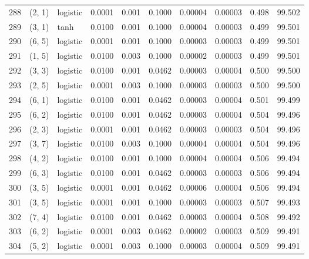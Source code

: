 \begin{tabular}{lllrrrrrrr}
288 &      (2, 1) &  logistic &  0.0001 &  0.001 &  0.1000 &          0.00004 &    0.00003 &       0.498 &    99.502 \\
289 &      (3, 1) &      tanh &  0.0100 &  0.001 &  0.1000 &          0.00004 &    0.00003 &       0.499 &    99.501 \\
290 &      (6, 5) &  logistic &  0.0001 &  0.001 &  0.1000 &          0.00003 &    0.00003 &       0.499 &    99.501 \\
291 &      (1, 5) &  logistic &  0.0100 &  0.003 &  0.1000 &          0.00002 &    0.00003 &       0.499 &    99.501 \\
292 &      (3, 3) &  logistic &  0.0100 &  0.001 &  0.0462 &          0.00003 &    0.00004 &       0.500 &    99.500 \\
293 &      (2, 5) &  logistic &  0.0001 &  0.003 &  0.1000 &          0.00003 &    0.00003 &       0.500 &    99.500 \\
294 &      (6, 1) &  logistic &  0.0100 &  0.001 &  0.0462 &          0.00003 &    0.00004 &       0.501 &    99.499 \\
295 &      (6, 2) &  logistic &  0.0100 &  0.001 &  0.0462 &          0.00003 &    0.00004 &       0.504 &    99.496 \\
296 &      (2, 3) &  logistic &  0.0001 &  0.001 &  0.0462 &          0.00003 &    0.00003 &       0.504 &    99.496 \\
297 &      (3, 7) &  logistic &  0.0100 &  0.003 &  0.1000 &          0.00004 &    0.00004 &       0.504 &    99.496 \\
298 &      (4, 2) &  logistic &  0.0100 &  0.001 &  0.1000 &          0.00004 &    0.00004 &       0.506 &    99.494 \\
299 &      (6, 3) &  logistic &  0.0100 &  0.001 &  0.0462 &          0.00003 &    0.00003 &       0.506 &    99.494 \\
300 &      (3, 5) &  logistic &  0.0001 &  0.001 &  0.0462 &          0.00006 &    0.00004 &       0.506 &    99.494 \\
301 &      (3, 5) &  logistic &  0.0001 &  0.001 &  0.1000 &          0.00003 &    0.00003 &       0.507 &    99.493 \\
302 &      (7, 4) &  logistic &  0.0100 &  0.001 &  0.0462 &          0.00003 &    0.00004 &       0.508 &    99.492 \\
303 &      (6, 2) &  logistic &  0.0001 &  0.003 &  0.0462 &          0.00002 &    0.00003 &       0.509 &    99.491 \\
304 &      (5, 2) &  logistic &  0.0001 &  0.003 &  0.1000 &          0.00003 &    0.00004 &       0.509 &    99.491 \\

\end{tabular}
